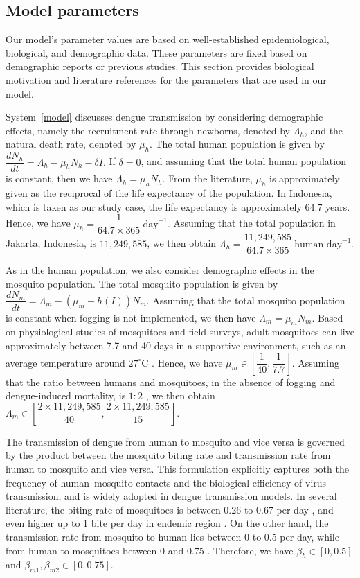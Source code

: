 \documentclass[preprint]{elsarticle}
\begin{document}
\subsection{Model parameters}
Our model's parameter values are based on well-established epidemiological, biological, and demographic data. These parameters are fixed based on demographic reports or previous studies. This section provides biological motivation and literature references for the parameters that are used in our model.

System~\eqref{model} discusses dengue transmission by considering demographic effects, namely the recruitment rate through newborns, denoted by $\Lambda_h$, and the natural death rate, denoted by $\mu_h$. The total human population is given by $\dfrac{dN_h}{dt} = \Lambda_h - \mu_h N_h - \delta I.$ If $\delta = 0$, and assuming that the total human population is constant, then we have $\Lambda_h = \mu_h N_h$. From the literature, $\mu_h$ is approximately given as the reciprocal of the life expectancy of the population. In Indonesia, which is taken as our study case, the life expectancy is approximately $64.7$ years. Hence, we have $\mu_h = \dfrac{1}{64.7 \times 365}\ \text{day}^{-1}.$ Assuming that the total population in Jakarta, Indonesia, is $11{,}249{,}585$, we then obtain $\Lambda_h = \dfrac{11{,}249{,}585}{64.7 \times 365}\ \text{human day}^{-1}.$

As in the human population, we also consider demographic effects in the mosquito population. The total mosquito population is given by $\dfrac{dN_m}{dt} = \Lambda_m - (\mu_m + h(I)) N_m$. Assuming that the total mosquito population is constant when fogging is not implemented, we then have $\Lambda_m = \mu_m N_m$. Based on physiological studies of mosquitoes and field surveys, adult mosquitoes can live approximately between 7.7 and 40 days in a supportive environment, such as an average temperature around $27^\circ$C \cite{Brady2013,Joy2012,Goindin2015}. Hence, we have $\mu_m \in \left[\dfrac{1}{40}, \dfrac{1}{7.7}\right]$. Assuming that the ratio between humans and mosquitoes, in the absence of fogging and dengue-induced mortality, is $1:2$ \cite{WIJAYA201983,Aguiar2022DengueModels}, we then obtain $\Lambda_m \in \left[\dfrac{2 \times 11{,}249{,}585}{40}, \dfrac{2 \times 11{,}249{,}585}{15}\right]$.

The transmission of dengue from human to mosquito and vice versa is governed by the product between the mosquito biting rate and transmission rate from human to mosquito and vice versa. This formulation explicitly captures both the frequency of human–mosquito contacts and the biological efficiency of virus transmission, and is widely adopted in dengue transmission models. In several literature, the biting rate of mosquitoes is between 0.26 to 0.67 per day \cite{Aguiar2022DengueModels,Ndii2016WolbachiaDengue,Mishra2020DengueADE}, and even higher up to 1 bite per day in endemic region \cite{EstevaVargas1998Dengue,YakobClements2013DengueModel}. On the other hand, the transmission rate from mosquito to human lies between 0 to 0.5 per day, while from human to mosquitoes between 0 and 0.75 \cite{Aguiar2022DengueModels,ALDILA2024115729,WOODALL201467,Rashkov01012021}. Therefore, we have $\beta_h \in [0, 0.5]$ and $\beta_{m1}, \beta_{m2} \in [0,0.75]$.
\end{document}
